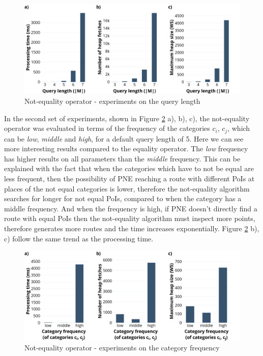 \begin{figure}[H]
	\includegraphics[scale=0.33]{images/neo_length.png}
	\centering
	\caption{Not-equality operator - experiments on the query length}
	\label{fig:neo_length}
\end{figure}

In the second set of experiments, shown in Figure \ref{fig:neo_frequency} a), b), c), the not-equality operator was evaluated in terms of the frequency of the categories $c_i$, $c_j$, which can be \textit{low}, \textit{middle} and \textit{high}, for a default query length of 5.  
Here we can see more interesting results compared to the equality operator. The \textit{low} frequency has higher results on all parameters than the \textit{middle} frequency. This can be explained with the fact that when the categories which have to not be equal are less frequent, then the possibility of PNE reaching a route with different PoIs at places of the not equal categories is lower, therefore the not-equality algorithm searches for longer for not equal PoIs, compared to when the category has a middle frequency. And when the frequency is high, if PNE doesn't directly find a route with equal PoIs then the not-equality algorithm must inspect more points, therefore generates more routes and the time increases exponentially. 
Figure \ref{fig:neo_frequency} b), c) follow the same trend as the processing time. 

\begin{figure}[H]
	\includegraphics[scale=0.33]{images/neo_frequency.png}
	\centering
	\caption{Not-equality operator - experiments on the category frequency}
	\label{fig:neo_frequency}
\end{figure}

